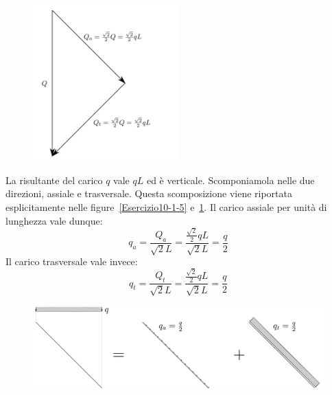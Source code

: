 \begin{figure}[ht]
\centering
\includegraphics[width=0.5\textwidth]{Immagini/Parte_10/Esercizio10_1_1/Esercizio10_1_6.pdf}
\caption{}
\label{Esercizio10-1-6}
\end{figure}
La risultante del carico $q$ vale $qL$ ed è verticale. Scomponiamola nelle due direzioni, assiale e trasversale. Questa scomposizione viene riportata esplicitamente nelle figure~\ref{Esercizio10-1-5} e~\ref{Esercizio10-1-6}. Il carico assiale per unità di lunghezza vale dunque: 
\begin{equation} \label{equazione10-1-6}
q_{a} = \frac{Q_{a}}{\sqrt{2}L} = \frac{\frac{\sqrt{2}}{2}qL}{\sqrt{2}L} = \frac{q}{2} \tag{10.1.7}
\end{equation}
Il carico trasversale vale invece:
\begin{equation} \label{equazione10-1-7}
q_{t} = \frac{Q_{t}}{\sqrt{2}L} = \frac{\frac{\sqrt{2}}{2}qL}{\sqrt{2}L} = \frac{q}{2} \tag{10.1.8}
\end{equation}
\renewcommand{\thefigure}{10.1~-~7}
\begin{figure}[ht]
\centering
\includegraphics[width=\textwidth]{Immagini/Parte_10/Esercizio10_1_1/Esercizio10_1_7.pdf}
\caption{}
\label{Esercizio10-1-7}
\end{figure}
